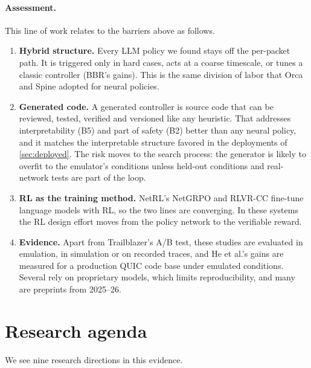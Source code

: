 \paragraph{Assessment.} This line of work relates to the barriers above as follows.
\begin{enumerate}
  \item \textbf{Hybrid structure.} Every LLM policy we found stays off the per-packet path. It is triggered only in hard cases, acts at a coarse timescale, or tunes a classic controller (BBR's gains). This is the same division of labor that Orca and Spine adopted for neural policies.
  \item \textbf{Generated code.} A generated controller is source code that can be reviewed, tested, verified and versioned like any heuristic. That addresses interpretability (B5) and part of safety (B2) better than any neural policy, and it matches the interpretable structure favored in the deployments of \cref{sec:deployed}. The risk moves to the search process: the generator is likely to overfit to the emulator's conditions unless held-out conditions and real-network tests are part of the loop.
  \item \textbf{RL as the training method.} NetRL's NetGRPO and RLVR-CC fine-tune language models with RL, so the two lines are converging. In these systems the RL design effort moves from the policy network to the verifiable reward.
  \item \textbf{Evidence.} Apart from Trailblazer's A/B test, these studies are evaluated in emulation, in simulation or on recorded traces, and He et al.'s gains are measured for a production QUIC code base under emulated conditions. Several rely on proprietary models, which limits reproducibility, and many are preprints from 2025--26.
\end{enumerate}

\section{Research agenda}
\label{sec:agenda}

We see nine research directions in this evidence.

